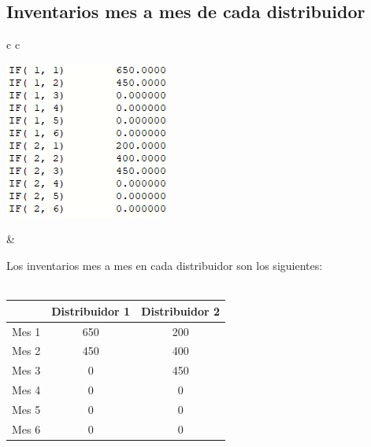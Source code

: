 \documentclass[12pt]{article}
\begin{document}
\subsection*{Inventarios mes a mes de cada distribuidor}
\begin{center}
\begin{tabular}{c c}
  \begin{minipage}[t]{0.4\linewidth}
    \vspace{0pt} %
    \includegraphics[width=\linewidth]{assets/inventarios.PNG}
  \end{minipage}
  &
  \begin{minipage}[t]{0.4\linewidth}
    \vspace{1pt}
    Los inventarios mes a mes en cada distribuidor son los siguientes: \\\\
    \vspace{0pt}
    \begin{tabular}{|l|c|c|}
      \hline
      & Distribuidor 1 & Distribuidor 2 \\
      \hline
      Mes 1 & 650 & 200 \\
      \hline
      Mes 2 & 450 & 400 \\
      \hline
      Mes 3 & 0 & 450 \\
      \hline
      Mes 4 & 0 & 0 \\
      \hline
      Mes 5 & 0 & 0 \\
      \hline
      Mes 6 & 0 & 0 \\
      \hline
    \end{tabular}
  \end{minipage}
\end{tabular}
\end{center}
\end{document}
